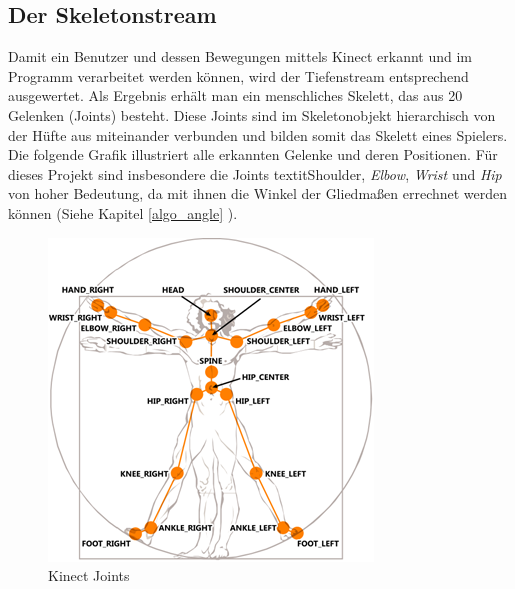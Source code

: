 %
%
\subsection{Der Skeletonstream}\label{skeleton}
Damit ein Benutzer und dessen Bewegungen mittels Kinect erkannt und im Programm verarbeitet werden können, wird der Tiefenstream entsprechend ausgewertet. Als Ergebnis erhält man ein menschliches Skelett, das aus
20 Gelenken (Joints) besteht. Diese Joints sind im Skeletonobjekt hierarchisch von der Hüfte aus miteinander verbunden und bilden somit das Skelett eines Spielers. Die folgende Grafik illustriert alle erkannten Gelenke und deren Positionen. Für dieses Projekt sind insbesondere die Joints textit{Shoulder}, \textit{Elbow}, \textit{Wrist} und \textit{Hip} von hoher Bedeutung, da mit ihnen die Winkel der Gliedmaßen errechnet werden können (Siehe Kapitel \ref{algo_angle} ).

\begin{figure}[H]						
	\centering							
	\includegraphics[scale=1.0]{Bilder/kinect_joints.png}			
	\caption{Kinect Joints \cite{ws:microsoft_jointType}}						
	\label{f:kinect_joints}						
\end{figure}

